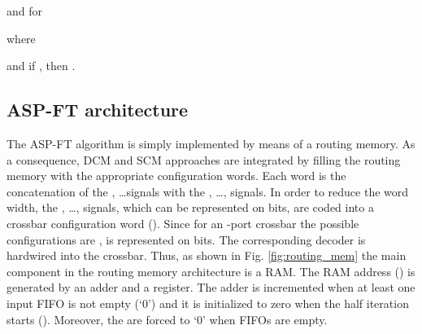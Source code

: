 \documentclass[10pt,twocolumn,journal]{IEEEtran}
\begin{document}
and for  

where

and if , then .


\subsection{ASP-FT architecture}
\label{subsec:ASP}
The ASP-FT algorithm is simply implemented by means of a routing memory. As a consequence, 
DCM and SCM 
approaches are integrated by filling the routing memory with the appropriate configuration words.
Each word is the concatenation of the , \dots  signals with the 
, \dots,  signals. In order to reduce the word width, 
the , \dots,  signals, which can be represented 
on  bits,  
are coded into a crossbar configuration word (). 
Since for an -port crossbar the possible configurations are ,  is 
represented on  bits.  
The corresponding decoder is hardwired into the crossbar. Thus, as shown in Fig. \ref{fig:routing_mem} the 
main component in the routing memory architecture is a RAM.
The RAM address () 
is generated by an adder and a register. 
The adder is incremented when at least one input FIFO is not empty (`0') and it is initialized to 
zero when the half iteration starts (). Moreover, the  are forced to `0' when FIFOs are 
empty.
\end{document}
